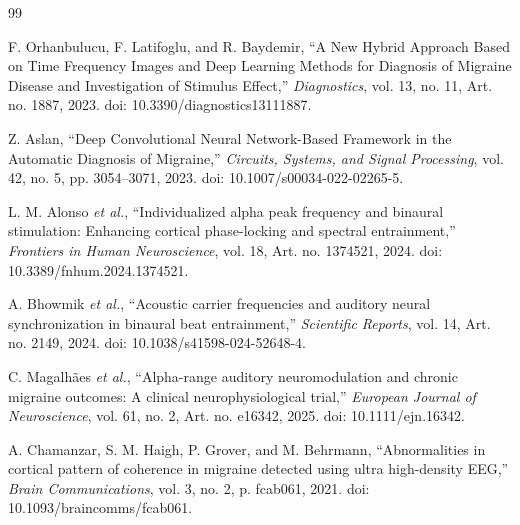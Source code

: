 \documentclass[12pt, a4paper]{report}
\begin{document}
\begin{thebibliography}{99}
\setlength{\itemsep}{0.2ex}
\setlength{\parskip}{0pt}

F. Orhanbulucu, F. Latifoglu, and R. Baydemir, ``A New Hybrid Approach Based on Time Frequency Images and Deep Learning Methods for Diagnosis of Migraine Disease and Investigation of Stimulus Effect,'' \textit{Diagnostics}, vol. 13, no. 11, Art. no. 1887, 2023. doi: 10.3390/diagnostics13111887.

Z. Aslan, ``Deep Convolutional Neural Network-Based Framework in the Automatic Diagnosis of Migraine,'' \textit{Circuits, Systems, and Signal Processing}, vol. 42, no. 5, pp. 3054--3071, 2023. doi: 10.1007/s00034-022-02265-5.

L. M. Alonso \textit{et al.}, ``Individualized alpha peak frequency and binaural stimulation: Enhancing cortical phase-locking and spectral entrainment,'' \textit{Frontiers in Human Neuroscience}, vol. 18, Art. no. 1374521, 2024. doi: 10.3389/fnhum.2024.1374521.

A. Bhowmik \textit{et al.}, ``Acoustic carrier frequencies and auditory neural synchronization in binaural beat entrainment,'' \textit{Scientific Reports}, vol. 14, Art. no. 2149, 2024. doi: 10.1038/s41598-024-52648-4.

C. Magalh\~aes \textit{et al.}, ``Alpha-range auditory neuromodulation and chronic migraine outcomes: A clinical neurophysiological trial,'' \textit{European Journal of Neuroscience}, vol. 61, no. 2, Art. no. e16342, 2025. doi: 10.1111/ejn.16342.

A. Chamanzar, S. M. Haigh, P. Grover, and M. Behrmann, ``Abnormalities in cortical pattern of coherence in migraine detected using ultra high-density EEG,'' \textit{Brain Communications}, vol. 3, no. 2, p. fcab061, 2021. doi: 10.1093/braincomms/fcab061.


\end{thebibliography}
\end{document}
